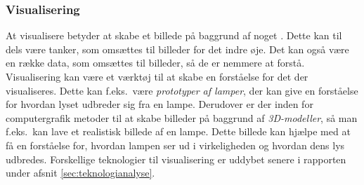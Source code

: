 \subsubsection{Visualisering}
At visualisere betyder at skabe et billede på baggrund af noget \cite{ddo_visualisering}. Dette kan til dels være tanker, som omsættes til billeder for det indre øje. Det kan også være en række data, som omsættes til billeder, så de er nemmere at forstå.
Visualisering kan være et værktøj til at skabe en forståelse for det der visualiseres. Dette kan f.eks.\ være \textit{prototyper af lamper}, der kan give en forståelse for hvordan lyset udbreder sig fra en lampe. Derudover er der inden for computergrafik metoder til at skabe billeder på baggrund af \textit{3D-modeller}, så man f.eks.\ kan lave et realistisk billede af en lampe. Dette billede kan hjælpe med at få en forståelse for, hvordan lampen ser ud i virkeligheden og hvordan dens lys udbredes. Forskellige teknologier til visualisering er uddybet senere i rapporten under afsnit \ref{sec:teknologianalyse}. 
